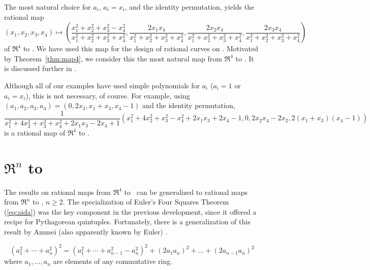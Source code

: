 \begin{example}
\label{eg:mostnatural}
The most natural choice for $a_i$,
$a_i=x_i$, and the identity permutation,
yields the rational map
\[
(x_1,x_2,x_3,x_4) \mapsto 
	(\frac{x_1^2 + x_2^2 + x_3^2 - x_4^2}{x_1^2 + x_2^2 + x_3^2 + x_4^2},
	 \frac{2x_1x_4}{x_1^2 + x_2^2 + x_3^2 + x_4^2}, 
	 \frac{2x_2x_4}{x_1^2 + x_2^2 + x_3^2 + x_4^2}, 
	 \frac{2x_3x_4}{x_1^2 + x_2^2 + x_3^2 + x_4^2})
\]
of $\Re^4$ to .
We have used this map for the design of rational curves on  \cite{jj95}.
Motivated by Theorem~\ref{thm:map4}, 
we consider this the most natural map from $\Re^4$ to .
It is discussed further in \cite{jj98}.
\end{example}
\begin{example}
Although all of our examples have used simple polynomials for $a_i$
($a_i=1$ or $a_i=x_i$),
this is not necessary, of course.
For example, using $(a_1,a_2,a_3,a_4) = (0,2x_2,x_1+x_3,x_4-1)$
and the identity permutation,
\footnotesize{
\[
\frac{1}{x_1^2 + 4x_2^2 + x_3^2 + x_4^2 + 2x_1x_3 - 2x_4 + 1}
	(x_1^2 + 4x_2^2 + x_3^2 - x_4^2 + 2x_1x_3 + 2x_4 - 1,
	 0,
	 2x_2x_4-2x_2,
	 2(x_1+x_3)(x_4-1))
\]
}
\normalsize{is a rational map of $\Re^4$ to .}
%
\end{example}

\vspace{.5in}

\section{$\Re^n$ to }
\label{sec:nn}

The results on rational maps from $\Re^4$ to \ can be generalized
to rational maps from $\Re^n$ to , $n \geq 2$.
The specialization of Euler's Four Squares Theorem (\ref{eq:aida})
was the key component in the previous development,
since it offered a recipe for Pythagorean quintuples.
Fortunately, there is a generalization of this result by
Ammei (also apparently known by Euler) \cite{dickson52}. %

\begin{lemma}[Ammei c. 1817]
\label{lem:ammei}
\begin{equation}
\label{eq:ammei}
	(a_1^2 + \cdots + a_n^2)^2 = 
	(a_1^2 + \cdots + a_{n-1}^2 - a_n^2)^2 + (2a_1a_n)^2 + \ldots + 
	(2a_{n-1}a_n)^2
\end{equation}
where $a_1,\ldots,a_n$ are elements of any commutative ring.
\end{lemma}


